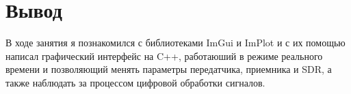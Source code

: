 \chapter{Вывод}
\label{ch:chap3}

В ходе занятия я познакомился с библиотеками ImGui и ImPlot и с их помощью написал 
графический интерфейс на C++, работаюший в режиме реального времени и позволяющий менять параметры передатчика, приемника и SDR, а также
наблюдать за процессом цифровой обработки сигналов.
\endinput